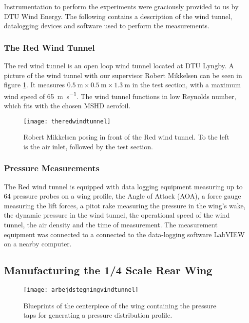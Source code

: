     Instrumentation to perform the experiments were graciously provided to us by DTU Wind Energy. The following contains a description of the wind tunnel, datalogging devices and software used to perform the measurements.

    \subsubsection{The Red Wind Tunnel}

      The red wind tunnel is an open loop wind tunnel located at DTU Lyngby. A picture of the wind tunnel with our supervisor Robert Mikkelsen can be seen in figure \ref{fig:theredwindtunnel}. It measures $\SI{0.5}{\metre} \times \SI{0.5}{\metre} \times \SI{1.3}{\metre}$ in the test section, with a maximum wind speed of \SI{65}{\metre\per\second}. The wind tunnel functions in low Reynolds number, which fits with the chosen MSHD aerofoil.

      \begin{figure}
        \texttt{[image: theredwindtunnel]}
        \caption{Robert Mikkelsen posing in front of the Red wind tunnel. To the left is the air inlet, followed by the test section.}
        \label{fig:theredwindtunnel}
      \end{figure}

    \subsubsection{Pressure Measurements}

      The Red wind tunnel is equipped with data logging equipment measuring up to 64 pressure probes on a wing profile, the Angle of Attack (AOA), a force gauge measuring the lift forces, a pitot rake measuring the pressure in the wing's wake, the dynamic pressure in the wind tunnel, the operational speed of the wind tunnel, the air density and the time of measurement. The measurement equipment was connected to a  connected to the data-logging software LabVIEW on a nearby computer.

  \subsection{Manufacturing the 1/4 Scale Rear Wing}

    \begin{figure}
      \texttt{[image: arbejdstegningvindtunnel]}
      \caption{Blueprints of the centerpiece of the wing containing the pressure taps for generating a pressure distribution profile.}
      \label{fig:scalewingblueprint}
    \end{figure}

